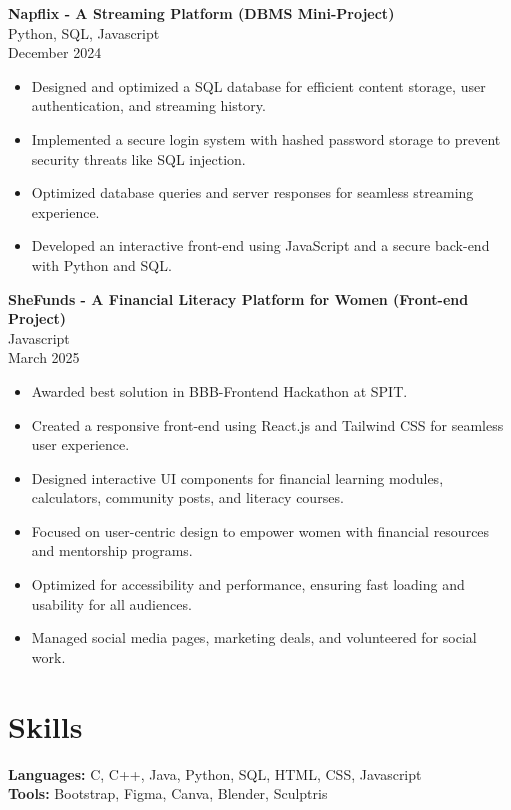 \documentclass{article}
\begin{document}
\textbf{Napflix - A Streaming Platform (DBMS Mini-Project)} \\
Python, SQL, Javascript \\
December 2024
\begin{itemize}
    \item Designed and optimized a SQL database for efficient content storage, user authentication, and streaming history.
    \item Implemented a secure login system with hashed password storage to prevent security threats like SQL injection.
    \item Optimized database queries and server responses for seamless streaming experience.
    \item Developed an interactive front-end using JavaScript and a secure back-end with Python and SQL.
\end{itemize}

\textbf{SheFunds - A Financial Literacy Platform for Women (Front-end Project)} \\
Javascript \\
March 2025
\begin{itemize}
    \item Awarded best solution in BBB-Frontend Hackathon at SPIT.
    \item Created a responsive front-end using React.js and Tailwind CSS for seamless user experience.
    \item Designed interactive UI components for financial learning modules, calculators, community posts, and literacy courses.
    \item Focused on user-centric design to empower women with financial resources and mentorship programs.
    \item Optimized for accessibility and performance, ensuring fast loading and usability for all audiences.
    \item Managed social media pages, marketing deals, and volunteered for social work.
\end{itemize}

\section*{Skills}
\textbf{Languages:} C, C++, Java, Python, SQL, HTML, CSS, Javascript \\
\textbf{Tools:} Bootstrap, Figma, Canva, Blender, Sculptris
\end{document}
